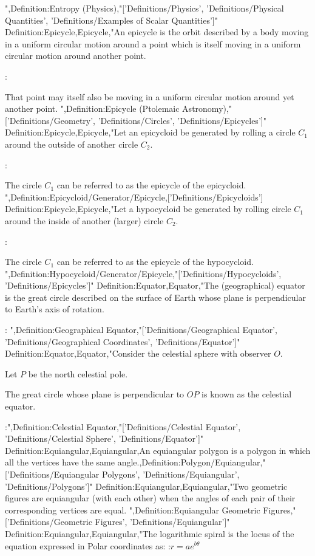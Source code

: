 ",Definition:Entropy (Physics),"['Definitions/Physics', 'Definitions/Physical Quantities', 'Definitions/Examples of Scalar Quantities']"
Definition:Epicycle,Epicycle,"An epicycle is the orbit described by a body moving in a uniform circular motion around a point which is itself moving in a uniform circular motion around another point.

:

That point may itself also be moving in a uniform circular motion around yet another point.
",Definition:Epicycle (Ptolemaic Astronomy),"['Definitions/Geometry', 'Definitions/Circles', 'Definitions/Epicycles']"
Definition:Epicycle,Epicycle,"Let an epicycloid be generated by rolling a circle $C_1$ around the outside of another circle $C_2$.


:


The circle $C_1$ can be referred to as the epicycle of the epicycloid.
",Definition:Epicycloid/Generator/Epicycle,['Definitions/Epicycloids']
Definition:Epicycle,Epicycle,"Let a hypocycloid be generated by rolling circle $C_1$ around the inside of another (larger) circle $C_2$.


:


The circle $C_1$ can be referred to as the epicycle of the hypocycloid.
",Definition:Hypocycloid/Generator/Epicycle,"['Definitions/Hypocycloids', 'Definitions/Epicycles']"
Definition:Equator,Equator,"The (geographical) equator is the great circle described on the surface of Earth whose plane is perpendicular to Earth's axis of rotation.


:
",Definition:Geographical Equator,"['Definitions/Geographical Equator', 'Definitions/Geographical Coordinates', 'Definitions/Equator']"
Definition:Equator,Equator,"Consider the celestial sphere with observer $O$.

Let $P$ be the north celestial pole.


The great circle whose plane is perpendicular to $OP$ is known as the celestial equator.


:",Definition:Celestial Equator,"['Definitions/Celestial Equator', 'Definitions/Celestial Sphere', 'Definitions/Equator']"
Definition:Equiangular,Equiangular,An equiangular polygon is a polygon in which all the vertices have the same angle.,Definition:Polygon/Equiangular,"['Definitions/Equiangular Polygons', 'Definitions/Equiangular', 'Definitions/Polygons']"
Definition:Equiangular,Equiangular,"Two geometric figures are equiangular (with each other) when the angles of each pair of their corresponding vertices are equal.
",Definition:Equiangular Geometric Figures,"['Definitions/Geometric Figures', 'Definitions/Equiangular']"
Definition:Equiangular,Equiangular,"The logarithmic spiral is the locus of the equation expressed in Polar coordinates as:
:$r = a e^{b \theta}$


